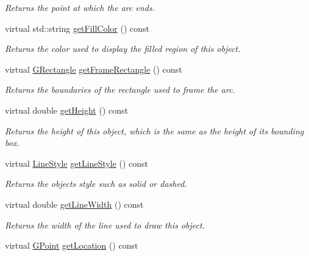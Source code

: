 \begin{DoxyCompactItemize}
\begin{DoxyCompactList}\small\item\em Returns the point at which the arc ends. \end{DoxyCompactList}\item 
virtual std\+::string \mbox{\hyperlink{classsgl_1_1GObject_a76f6964a11fde7c78e9751be184e1a3c}{get\+Fill\+Color}} () const
\begin{DoxyCompactList}\small\item\em Returns the color used to display the filled region of this object. \end{DoxyCompactList}\item 
virtual \mbox{\hyperlink{structsgl_1_1GRectangle}{G\+Rectangle}} \mbox{\hyperlink{classsgl_1_1GArc_aab1e594176fa66cc7bd50c1f77218428}{get\+Frame\+Rectangle}} () const
\begin{DoxyCompactList}\small\item\em Returns the boundaries of the rectangle used to frame the arc. \end{DoxyCompactList}\item 
virtual double \mbox{\hyperlink{classsgl_1_1GObject_a1e7e353362434072875264cf95629f99}{get\+Height}} () const
\begin{DoxyCompactList}\small\item\em Returns the height of this object, which is the same as the height of its bounding box. \end{DoxyCompactList}\item 
virtual \mbox{\hyperlink{classsgl_1_1GObject_a86e0f5648542856159bb40775c854aa7}{Line\+Style}} \mbox{\hyperlink{classsgl_1_1GObject_aaf1f5ea8281e5e3486662878d26f0a13}{get\+Line\+Style}} () const
\begin{DoxyCompactList}\small\item\em Returns the object\textquotesingle{}s style such as solid or dashed. \end{DoxyCompactList}\item 
virtual double \mbox{\hyperlink{classsgl_1_1GObject_a85ff266dc3eb63d9f2d8e5a4487fd3c0}{get\+Line\+Width}} () const
\begin{DoxyCompactList}\small\item\em Returns the width of the line used to draw this object. \end{DoxyCompactList}\item 
virtual \mbox{\hyperlink{structsgl_1_1GPoint}{G\+Point}} \mbox{\hyperlink{classsgl_1_1GObject_a4f83802015511edeb63b892830812c11}{get\+Location}} () const

\end{DoxyCompactItemize}
